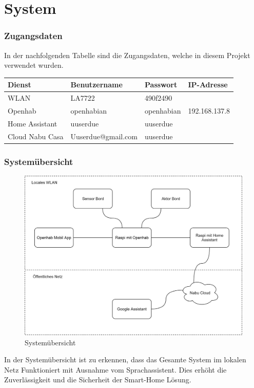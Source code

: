 \section{System}\label{sec:Schluss}
\subsubsection{Zugangsdaten}
In der nachfolgenden Tabelle sind die Zugangsdaten, welche in diesem Projekt verwendet wurden.

\begin{table}[H]
	\centering
	\begin{tabular}{|l|l|l|l|}
		\hline 
		Dienst & Benutzername & Passwort & IP-Adresse \\ 
		\hline 
		WLAN & LA7722 & 490f2490 &  \\ 
		\hline 
		Openhab & openhabian & openhabian & 192.168.137.8 \\ 
		\hline 
		Home Assistant & uuserdue & uuserdue &  \\ 
		\hline 
		Cloud Nabu Casa & Uuserdue@gmail.com&uuserdue&\\
		\hline
	\end{tabular} 
\end{table}
\subsubsection{Systemübersicht}
   \begin{figure}[H]
	\centering
	\includegraphics[width=\textwidth]{graphics/Systemubersicht.png}
	\caption{Systemübersicht} 	
	\label{pic: Systemübersicht}
\end{figure}
In der Systemübersicht ist zu erkennen, dass das Gesamte System im lokalen Netz Funktioniert mit Ausnahme vom Sprachassistent. Dies erhöht die Zuverlässigkeit und die Sicherheit der Smart-Home Lösung. 





